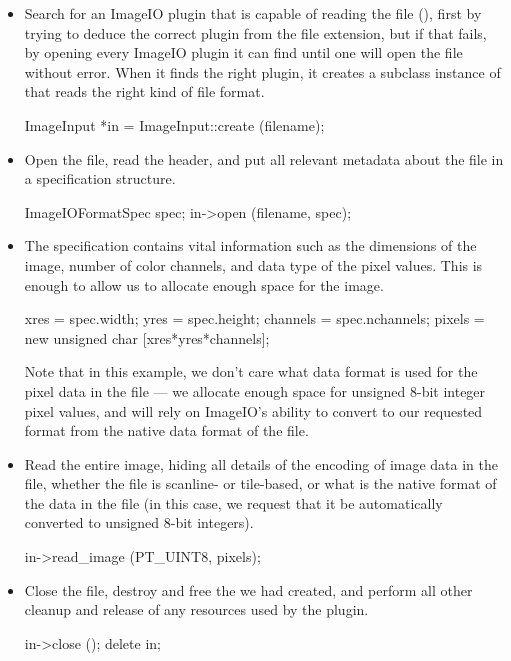 \begin{itemize}
\item Search for an ImageIO plugin that is capable of reading the file
  (), first by trying to deduce the correct plugin from the
  file extension, but if that fails, by opening every ImageIO plugin it
  can find until one will open the file without error.  When it finds
  the right plugin, it creates a subclass instance of \ImageInput that
  reads the right kind of file format.
  \begin{code}
    ImageInput *in = ImageInput::create (filename);
  \end{code}
\item Open the file, read the header, and put all relevant metadata
  about the file in a specification structure.
  \begin{code}
    ImageIOFormatSpec spec;
    in->open (filename, spec);
  \end{code}
\item The specification contains vital information such as the
  dimensions of the image, number of color channels, and data type of
  the pixel values.  This is enough to allow us to allocate enough space
  for the image.
  \begin{code}
    xres = spec.width;
    yres = spec.height;
    channels = spec.nchannels;
    pixels = new unsigned char [xres*yres*channels];
  \end{code}
  Note that in this example, we don't care what data format is used for
  the pixel data in the file --- we allocate enough space for unsigned
  8-bit integer pixel values, and will rely on ImageIO's ability to
  convert to our requested format from the native data format of the
  file.
\item Read the entire image, hiding all details of the encoding of image
  data in the file, whether the file is scanline- or tile-based, or what
  is the native format of the data in the file (in this case, we request
  that it be automatically converted to unsigned 8-bit integers).
  \begin{code}
    in->read_image (PT_UINT8, pixels);
  \end{code}
\item Close the file, destroy and free the \ImageInput we had created,
  and perform all other cleanup and release of any resources used by
  the plugin.
  \begin{code}
    in->close ();
    delete in;
  \end{code}
\end{itemize}

